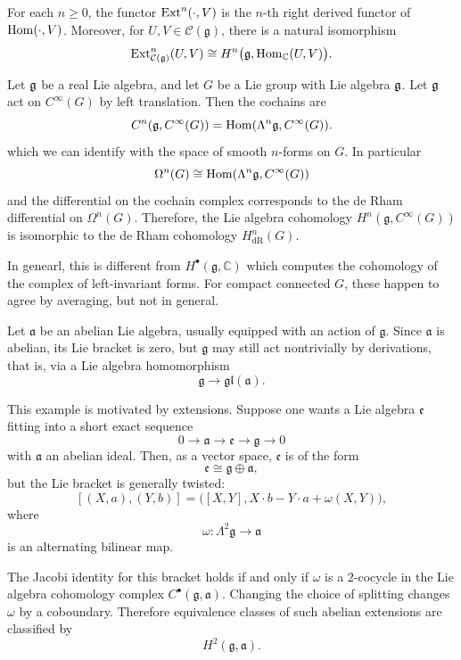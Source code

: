\documentclass[12pt]{article}
\begin{document}
\begin{proposition}
For each \(n\ge 0\), the functor \(\operatorname{Ext}^n(\cdot,V)\) is the \(n\)-th right derived functor of \(\operatorname{Hom}(\cdot,V)\). Moreover, for \(U,V \in \mathcal C(\mathfrak g)\), there is a natural isomorphism
\[
\operatorname{Ext}^n_{\mathcal C(\mathfrak g)}(U,V)
\cong
H^n\bigl(\mathfrak g,\operatorname{Hom}_{\mathbb C}(U,V)\bigr).
\]
\end{proposition}

\begin{example}
    Let $\mathfrak{g}$ be a real Lie algebra, and let $G$ be a Lie group with Lie algebra $\mathfrak{g}$. Let $\mathfrak{g}$ act on $C^\infty(G)$ by left translation. Then the cochains are
\[
C^n(\mathfrak g,C^\infty(G))=\operatorname{Hom}(\Lambda^n\mathfrak g,C^\infty(G)).
\] which we can identify with the space of smooth $n$-forms on $G$. In particular 
\[
\Omega^n(G)\cong \operatorname{Hom}(\Lambda^n\mathfrak g,C^\infty(G))
\] and the differential on the cochain complex corresponds to the de Rham differential on $\Omega^n(G)$. Therefore, the Lie algebra cohomology $H^n(\mathfrak g,C^\infty(G))$ is isomorphic to the de Rham cohomology $H^n_{\text{dR}}(G)$.

In genearl, this is different from $H^\bullet(\mathfrak g,\mathbb C)$ which computes the cohomology of the complex of left-invariant forms. For compact connected $G$, these happen to agree by averaging, but not in general.
\end{example}

\begin{example}Let \(\mathfrak a\) be an abelian Lie algebra, usually equipped with an action of \(\mathfrak g\). Since \(\mathfrak a\) is abelian, its Lie bracket is zero, but \(\mathfrak g\) may still act nontrivially by derivations, that is, via a Lie algebra homomorphism
\[
\mathfrak g \to \mathfrak{gl}(\mathfrak a).
\]

This example is motivated by extensions. Suppose one wants a Lie algebra \(\mathfrak e\) fitting into a short exact sequence
\[
0 \longrightarrow \mathfrak a \longrightarrow \mathfrak e \longrightarrow \mathfrak g \longrightarrow 0
\]
with \(\mathfrak a\) an abelian ideal. Then, as a vector space, \(\mathfrak e\) is of the form
\[
\mathfrak e \cong \mathfrak g \oplus \mathfrak a,
\]
but the Lie bracket is generally twisted:
\[
[(X,a),(Y,b)]
=
\bigl([X,Y], X\cdot b - Y\cdot a + \omega(X,Y)\bigr),
\]
where
\[
\omega:\Lambda^2\mathfrak g \to \mathfrak a
\]
is an alternating bilinear map.

The Jacobi identity for this bracket holds if and only if \(\omega\) is a \(2\)-cocycle in the Lie algebra cohomology complex $C^\bullet(\mathfrak g,\mathfrak a)$. Changing the choice of splitting changes \(\omega\) by a coboundary. Therefore equivalence classes of such abelian extensions are classified by
\[
H^2(\mathfrak g,\mathfrak a).
\]
\end{example}
\end{document}
